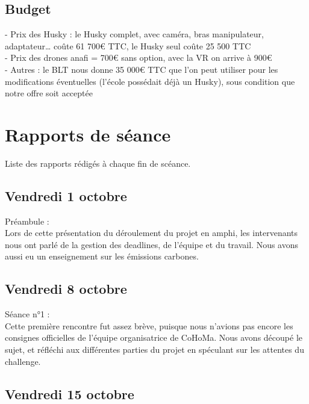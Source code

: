 \documentclass[11pt]{article}
\begin{document}
\subsection{Budget}

-    Prix des Husky : le Husky complet, avec caméra, bras manipulateur, adaptateur… coûte 61 700€ TTC, le Husky seul coûte 25 500 TTC \\
-    Prix des drones anafi = 700€ sans option, avec la VR on arrive à 900€ \\
-    Autres : le BLT nous donne 35 000€ TTC que l’on peut utiliser pour les modifications éventuelles (l’école possédait déjà un Husky), sous condition que notre offre soit acceptée \\


\appendix

\section{Rapports de séance}

Liste des rapports rédigés à chaque fin de scéance.
 
\subsection{Vendredi 1 octobre}

Préambule : \\

Lors de cette présentation du déroulement du projet en amphi, les intervenants nous ont parlé de la gestion des deadlines, de l’équipe et du travail. Nous avons aussi eu un enseignement sur les émissions carbones.

\subsection{Vendredi 8 octobre} 

Séance n°1 : \\

Cette première rencontre fut assez brève, puisque nous n’avions pas encore les consignes officielles de l’équipe organisatrice de CoHoMa. Nous avons découpé le sujet, et réfléchi aux différentes parties du projet en spéculant sur les attentes du challenge.

\subsection{Vendredi 15 octobre} 
\end{document}
